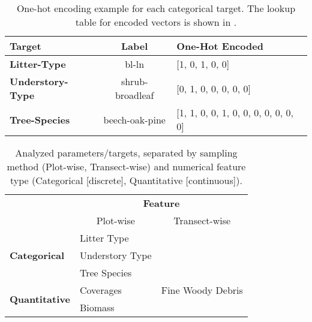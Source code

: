 \begin{table}[ht]
  \caption{One-hot encoding example for each categorical target. The lookup table for encoded vectors is shown in .}
  \begin{tabularx}{\textwidth}{@{}lcX@{}} 
      \toprule
      \textbf{Target}            & \textbf{Label}    & \textbf{One-Hot Encoded} \\ \midrule
      \textbf{Litter-Type}       & bl-ln             & [1, 0, 1, 0, 0] \\%
      \textbf{Understory-Type}   & shrub-broadleaf   & [0, 1, 0, 0, 0, 0, 0] \\%
      \textbf{Tree-Species}      & beech-oak-pine    & [1, 1, 0, 0, 1, 0, 0, 0, 0, 0, 0, 0] \\ \bottomrule
  \end{tabularx}
  \space\label{tab:OneHot_Cat}
\end{table}


\begin{table}[htbp]
  \caption{Analyzed parameters/targets, separated by sampling method (Plot-wise, Transect-wise) and numerical feature type (Categorical [discrete], Quantitative [continuous]).}
  \centering
  \begin{tabularx}{\textwidth}{lXX}
      \toprule
      & \multicolumn{2}{c}{\textbf{Feature}} \\ 
      & \multicolumn{1}{c}{Plot-wise} & \multicolumn{1}{c}{Transect-wise} \\
      \midrule
      \multirow{3}{*}{\textbf{Categorical}}  & \hfil Litter Type       &  \\ 
                                              & \hfil Understory Type   &  \\
                                              & \hfil Tree Species      &  \\
      \midrule
      \multirow{3}{*}{\textbf{Quantitative}} & \hfil Coverages         & \hfil Fine Woody Debris  \\ 
                                              & \hfil Biomass           & \hfil              \\
      \bottomrule
  \end{tabularx}
  \space\label{tab:Data_FeatureList} 
\end{table}




